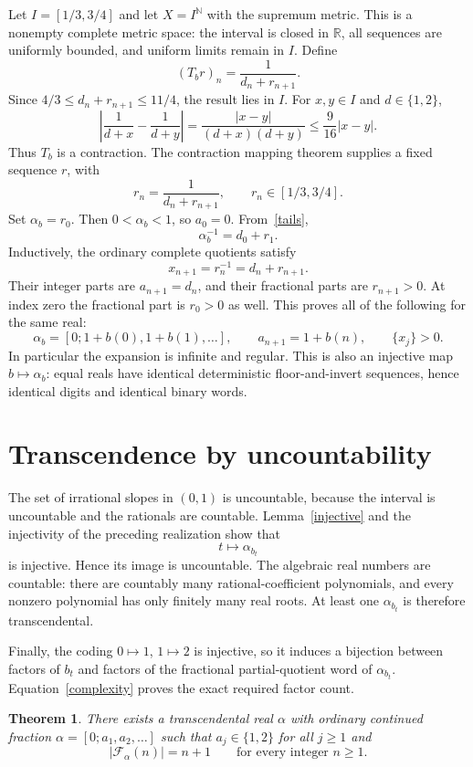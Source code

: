 \documentclass[11pt]{article}
\newtheorem{theorem}{Theorem}
\newcommand{\R}{\mathbb R}
\newcommand{\N}{\mathbb N}
\begin{document}
Let $I=[1/3,3/4]$ and let $X=I^{\N}$ with the supremum metric. This is a nonempty complete metric space: the interval is closed in $\R$, all sequences are uniformly bounded, and uniform limits remain in $I$. Define
\[
 (T_b r)_n=\frac1{d_n+r_{n+1}}.
\]
Since $4/3\leq d_n+r_{n+1}\leq11/4$, the result lies in $I$. For $x,y\in I$ and $d\in\{1,2\}$,
\[
 \left|\frac1{d+x}-\frac1{d+y}\right|
 =\frac{|x-y|}{(d+x)(d+y)}
 \leq\frac9{16}|x-y|.
\]
Thus $T_b$ is a contraction. The contraction mapping theorem supplies a fixed sequence $r$, with
\begin{equation}\label{tails}
 r_n=\frac1{d_n+r_{n+1}},\qquad r_n\in[1/3,3/4].
\end{equation}
Set $\alpha_b=r_0$. Then $0<\alpha_b<1$, so $a_0=0$. From~\eqref{tails},
\[
 \alpha_b^{-1}=d_0+r_1.
\]
Inductively, the ordinary complete quotients satisfy
\[
 x_{n+1}=r_n^{-1}=d_n+r_{n+1}.
\]
Their integer parts are $a_{n+1}=d_n$, and their fractional parts are $r_{n+1}>0$. At index zero the fractional part is $r_0>0$ as well. This proves all of the following for the same real:
\[
 \alpha_b=[0;1+b(0),1+b(1),\ldots],\qquad
 a_{n+1}=1+b(n),\qquad \{x_j\}>0.
\]
In particular the expansion is infinite and regular. This is also an injective map $b\mapsto\alpha_b$: equal reals have identical deterministic floor-and-invert sequences, hence identical digits and identical binary words.

\section{Transcendence by uncountability}
The set of irrational slopes in $(0,1)$ is uncountable, because the interval is uncountable and the rationals are countable. Lemma~\ref{injective} and the injectivity of the preceding realization show that
\[
 t\longmapsto\alpha_{b_t}
\]
is injective. Hence its image is uncountable. The algebraic real numbers are countable: there are countably many rational-coefficient polynomials, and every nonzero polynomial has only finitely many real roots. At least one $\alpha_{b_t}$ is therefore transcendental.

Finally, the coding $0\mapsto1$, $1\mapsto2$ is injective, so it induces a bijection between factors of $b_t$ and factors of the fractional partial-quotient word of $\alpha_{b_t}$. Equation~\eqref{complexity} proves the exact required factor count.

\begin{theorem}
There exists a transcendental real $\alpha$ with ordinary continued fraction $\alpha=[0;a_1,a_2,\ldots]$ such that $a_j\in\{1,2\}$ for all $j\geq1$ and
\[
 |\mathcal F_\alpha(n)|=n+1\qquad\text{for every integer }n\geq1.
\]
\end{theorem}
\end{document}
